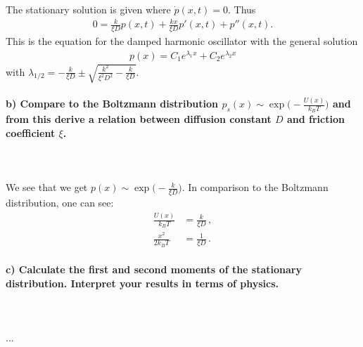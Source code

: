     The stationary solution is given where $\dot{p}(x,t) = 0$. Thus
    \begin{align}
    	0 = \frac{k}{\xi D} p(x,t) + \frac{kx}{\xi D} p'(x,t) + p''(x,t).
    \end{align}
    This is the equation for the damped harmonic oscillator with the general solution
    \begin{align}
    	p(x) = C_1 e^{\lambda_1 x} + C_2 e^{\lambda_2 x}
    \end{align}
    with $\lambda_{1/2} = -\frac{k}{\xi D} \pm \sqrt{\frac{k^2}{\xi^2 D^2} - \frac{k}{\xi D}}$.


\newpage
\paragraph{b) Compare to the Boltzmann distribution 
    $p_s(x)\sim\exp\bigg(-\frac{U(x)}{k_BT}\bigg)$ and from this derive a 
    relation between diffusion constant $D$ and friction coefficient $\xi$.
} \ \\
\\
    We see that we get $p(x)\sim\exp\bigg(-\frac{k}{\xi D}\bigg)$. In comparison to the Boltzmann
    distribution, one can see:
    \begin{align}
    \frac{U(x)}{k_BT} &= \frac{k}{\xi D} \,, \\
    \frac{x^2}{2k_BT} &= \frac{1}{\xi D} \,.
    \end{align}

\paragraph{c) Calculate the first and second moments of the stationary
    distribution. Interpret your results in terms of physics.
} \ \\
\\
    ...

